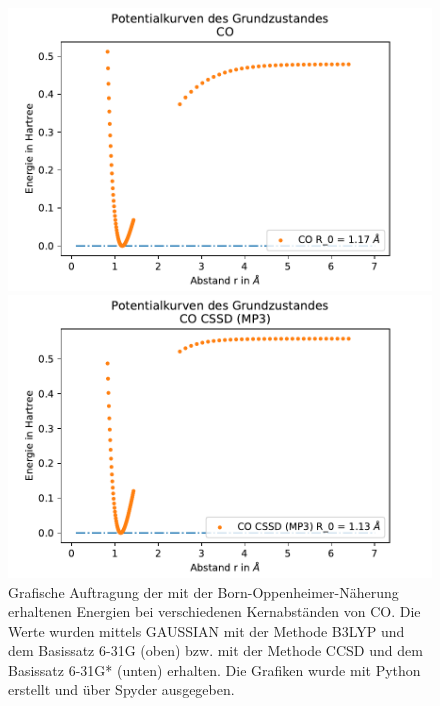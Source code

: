  
\begin{figure}[H]
	\center
	\begin{minipage}{0.8\textwidth}
	\includegraphics[width=\textwidth]{Bilder/CO_b3lyp.pdf}
	
	\end{minipage}
\begin{minipage}{0.8\textwidth}
	\includegraphics[width=\textwidth]{Bilder/CO_CSSD(MP3).pdf}
	
	\end{minipage}	
	\caption{Grafische Auftragung der mit der Born-Oppenheimer-Näherung erhaltenen Energien bei verschiedenen Kernabständen von CO. Die Werte wurden mittels GAUSSIAN mit der Methode B3LYP und dem Basissatz 6-31G (oben) bzw. mit der Methode CCSD und dem Basissatz 6-31G* (unten) erhalten. Die Grafiken wurde mit Python erstellt und über Spyder ausgegeben.}
	\label{CO}
		
	
\end{figure}
	

